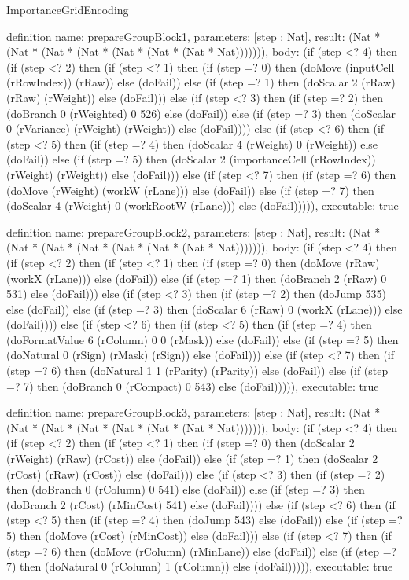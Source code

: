 \begin{lexlean}{ImportanceGridEncoding}
\begin{semanticmodule}
definition{
  name: prepareGroupBlock1,
  parameters: [step : Nat],
  result: (Nat * (Nat * (Nat * (Nat * (Nat * (Nat * (Nat * Nat))))))),
  body: (if (step <? 4) then
      (if (step <? 2) then
      (if (step <? 1) then
      (if (step =? 0) then (doMove (inputCell (rRowIndex)) (rRaw)) else (doFail)) else
      (if (step =? 1) then (doScalar 2 (rRaw) (rRaw) (rWeight)) else (doFail))) else
      (if (step <? 3) then
      (if (step =? 2) then (doBranch 0 (rWeighted) 0 526) else (doFail)) else
      (if (step =? 3) then (doScalar 0 (rVariance) (rWeight) (rWeight)) else (doFail)))) else
      (if (step <? 6) then
      (if (step <? 5) then
      (if (step =? 4) then (doScalar 4 (rWeight) 0 (rWeight)) else (doFail)) else
      (if (step =? 5) then (doScalar 2 (importanceCell (rRowIndex)) (rWeight) (rWeight)) else (doFail))) else
      (if (step <? 7) then
      (if (step =? 6) then (doMove (rWeight) (workW (rLane))) else (doFail)) else
      (if (step =? 7) then (doScalar 4 (rWeight) 0 (workRootW (rLane))) else (doFail))))),
  executable: true
}

definition{
  name: prepareGroupBlock2,
  parameters: [step : Nat],
  result: (Nat * (Nat * (Nat * (Nat * (Nat * (Nat * (Nat * Nat))))))),
  body: (if (step <? 4) then
      (if (step <? 2) then
      (if (step <? 1) then
      (if (step =? 0) then (doMove (rRaw) (workX (rLane))) else (doFail)) else
      (if (step =? 1) then (doBranch 2 (rRaw) 0 531) else (doFail))) else
      (if (step <? 3) then
      (if (step =? 2) then (doJump 535) else (doFail)) else
      (if (step =? 3) then (doScalar 6 (rRaw) 0 (workX (rLane))) else (doFail)))) else
      (if (step <? 6) then
      (if (step <? 5) then
      (if (step =? 4) then (doFormatValue 6 (rColumn) 0 0 (rMask)) else (doFail)) else
      (if (step =? 5) then (doNatural 0 (rSign) (rMask) (rSign)) else (doFail))) else
      (if (step <? 7) then
      (if (step =? 6) then (doNatural 1 1 (rParity) (rParity)) else (doFail)) else
      (if (step =? 7) then (doBranch 0 (rCompact) 0 543) else (doFail))))),
  executable: true
}

definition{
  name: prepareGroupBlock3,
  parameters: [step : Nat],
  result: (Nat * (Nat * (Nat * (Nat * (Nat * (Nat * (Nat * Nat))))))),
  body: (if (step <? 4) then
      (if (step <? 2) then
      (if (step <? 1) then
      (if (step =? 0) then (doScalar 2 (rWeight) (rRaw) (rCost)) else (doFail)) else
      (if (step =? 1) then (doScalar 2 (rCost) (rRaw) (rCost)) else (doFail))) else
      (if (step <? 3) then
      (if (step =? 2) then (doBranch 0 (rColumn) 0 541) else (doFail)) else
      (if (step =? 3) then (doBranch 2 (rCost) (rMinCost) 541) else (doFail)))) else
      (if (step <? 6) then
      (if (step <? 5) then
      (if (step =? 4) then (doJump 543) else (doFail)) else
      (if (step =? 5) then (doMove (rCost) (rMinCost)) else (doFail))) else
      (if (step <? 7) then
      (if (step =? 6) then (doMove (rColumn) (rMinLane)) else (doFail)) else
      (if (step =? 7) then (doNatural 0 (rColumn) 1 (rColumn)) else (doFail))))),
  executable: true
}


\end{semanticmodule}
\end{lexlean}
